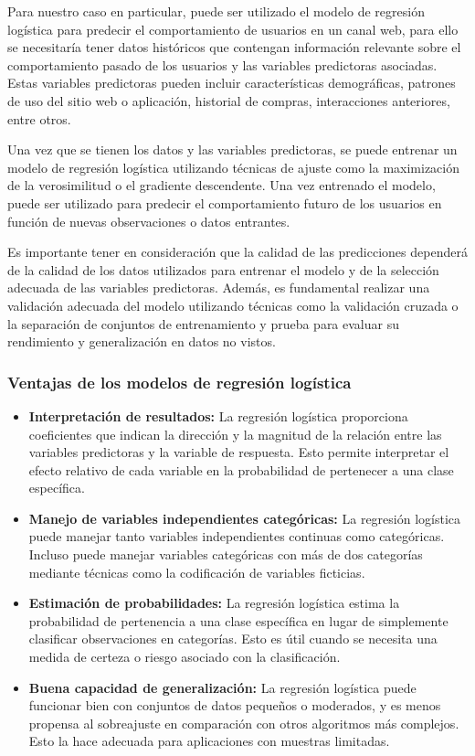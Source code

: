 Para nuestro caso en particular, puede ser utilizado el modelo de regresión logística para predecir el comportamiento de usuarios en un canal web, para ello se necesitaría tener datos históricos que contengan información relevante sobre el comportamiento pasado de los usuarios y las variables predictoras asociadas. Estas variables predictoras pueden incluir características demográficas, patrones de uso del sitio web o aplicación, historial de compras, interacciones anteriores, entre otros.

Una vez que se tienen los datos y las variables predictoras, se puede entrenar un modelo de regresión logística utilizando técnicas de ajuste como la maximización de la verosimilitud o el gradiente descendente. Una vez entrenado el modelo, puede ser utilizado para predecir el comportamiento futuro de los usuarios en función de nuevas observaciones o datos entrantes.

Es importante tener en consideración que la calidad de las predicciones dependerá de la calidad de los datos utilizados para entrenar el modelo y de la selección adecuada de las variables predictoras. Además, es fundamental realizar una validación adecuada del modelo utilizando técnicas como la validación cruzada o la separación de conjuntos de entrenamiento y prueba para evaluar su rendimiento y generalización en datos no vistos.

\subsubsection{Ventajas de los modelos de regresión logística}
\begin{itemize}
        \item \textbf{Interpretación de resultados:} La regresión logística proporciona coeficientes que indican la dirección y la magnitud de la relación entre las variables predictoras y la variable de respuesta. Esto permite interpretar el efecto relativo de cada variable en la probabilidad de pertenecer a una clase específica.
        \item \textbf{Manejo de variables independientes categóricas:} La regresión logística puede manejar tanto variables independientes continuas como categóricas. Incluso puede manejar variables categóricas con más de dos categorías mediante técnicas como la codificación de variables ficticias.
        \item \textbf{Estimación de probabilidades:} La regresión logística estima la probabilidad de pertenencia a una clase específica en lugar de simplemente clasificar observaciones en categorías. Esto es útil cuando se necesita una medida de certeza o riesgo asociado con la clasificación.
        \item \textbf{Buena capacidad de generalización:} La regresión logística puede funcionar bien con conjuntos de datos pequeños o moderados, y es menos propensa al sobreajuste en comparación con otros algoritmos más complejos. Esto la hace adecuada para aplicaciones con muestras limitadas.
\end{itemize}


